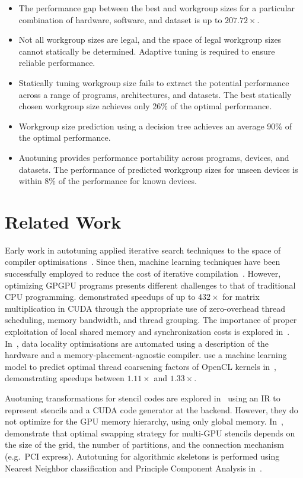 \documentclass[nonatbib,preprint,nocopyrightspace,9pt]{sigplanconf}
\begin{document}
\begin{itemize}
\item The performance gap between the best and workgroup sizes for a
  particular combination of hardware, software, and dataset is up to
  $207.72\times$.
\item Not all workgroup sizes are legal, and the space of legal
  workgroup sizes cannot statically be determined. Adaptive tuning is required
  to ensure reliable performance.
\item Statically tuning workgroup size fails to extract the potential
  performance across a range of programs, architectures, and datasets. The best
  statically chosen workgroup size achieves only 26\% of the optimal
  performance.
\item Workgroup size prediction using a decision tree achieves an
  average 90\% of the optimal performance.
\item Auotuning provides performance portability across programs,
  devices, and datasets. The performance of predicted workgroup sizes for unseen
  devices is within 8\% of the performance for known devices.
\end{itemize}


\section{Related Work}\label{sec:related}

Early work in autotuning applied iterative search techniques to the space of
compiler optimisations~\cite{Bodin1998,Kisuki}. Since then, machine learning
techniques have been successfully employed to reduce the cost of iterative
compilation~\cite{Agakov,Stephenson2003,Fursin2011}. However, optimizing GPGPU
programs presents different challenges to that of traditional CPU programming.
\citeauthor{Ryoo2008a} demonstrated speedups of up to $432\times$ for matrix
multiplication in CUDA through the appropriate use of zero-overhead thread
scheduling, memory bandwidth, and thread grouping. The importance of proper
exploitation of local shared memory and synchronization costs is explored
in~\cite{Lee2010}. In~\cite{Chen2014}, data locality optimisations are automated
using a description of the hardware and a memory-placement-agnostic compiler.
\citeauthor{Magni2014} use a machine learning model to predict optimal thread
coarsening factors of OpenCL kernels in~\cite{Magni2014}, demonstrating speedups
between $1.11\times$ and $1.33\times$.

Auotuning transformations for stencil codes are explored in~\cite{Kamil2010}
using an IR to represent stencils and a CUDA code generator at the backend.
However, they do not optimize for the GPU memory hierarchy, using only global
memory. In~\cite{Lutz2013}, \citeauthor{Lutz2013} demonstrate that optimal
swapping strategy for multi-GPU stencils depends on the size of the grid, the
number of partitions, and the connection mechanism (e.g.\ PCI express).
Autotuning for algorithmic skeletons is performed using Nearest Neighbor
classification and Principle Component Analysis in~\cite{Collins2013}.
\end{document}

